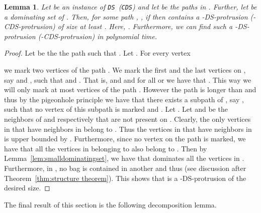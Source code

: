 \documentclass[11pt]{article}
\newtheorem{lemma}{Lemma}
\newcommand{\tDS}{{\texttt{\sc DS}}}
\newcommand{\tCDS}{{\texttt{\sc CDS}}}
\begin{document}
\begin{lemma}
\label{lem:boundingpaths}
Let  be an instance of  \tDS\ (\tCDS) and let  be the  paths in . Further, let  be a dominating set of . 
Then,  for some path , , if  then  contains a -{\sc DS}-protrusion (-{\sc CDS}-protrusion) of size at least .  Here,  . Furthermore, we can find such a  -{\sc DS}-protrusion (-{\sc CDS}-protrusion) in polynomial time. 
\end{lemma}
\begin{proof} 
Let  be the the path such that . 
Let 
. For 
every vertex 

we mark two vertices of the path . We mark the first and 
the last vertices on , say  and , such that  and .  That is, 
 and  and for all  or  we have that .  
This way we will only mark at most  vertices of the path . However the path is longer than 
  and thus by the pigeonhole principle we have that there exists a subpath of , say , such that no vertex of this subpath is marked and . 
 Let . Let  and  be the neighbors of   and  respectively 
that are not present on  
. Clearly, the only vertices in  that have neighbors in  belong to 
.  
Thus the vertices in  that have neighbors in   is upper bounded by . Furthermore, since no vertex on the path  is marked, we have that all the vertices in  belonging to  also belong to . Then by Lemma~\ref{lem:smalldominatingset}, we have that 
 dominates all the vertices in . Furthermore, in , 
no bag is contained in another and thus  (see discussion after Theorem~\ref{thm:structure theorem}). This shows that  is a -{\sc DS}-protrusion of the desired size.
\end{proof}


The final result of this section is the following decomposition lemma. 
\end{document}
